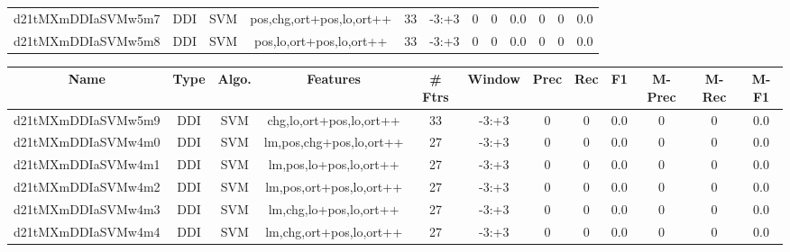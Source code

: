 \documentclass[a4paper]{article}
\begin{document}
\begin{landscape}
\begin{center}
\begin{tabular}{ |c|c|c|c|c|c|c|c|c|c|c|c|}
 
 	
 	\small{ d21tMXmDDIaSVMw5m7 } & \small{ DDI} & \small{  SVM }  & pos,chg,ort+pos,lo,ort++  &  33 &  \small{  -3:+3 }  &  0 & 0 & 0.0  &  0 & 0 & 0.0 \\
 	

 
 	
 	\small{ d21tMXmDDIaSVMw5m8 } & \small{ DDI} & \small{  SVM }  & pos,lo,ort+pos,lo,ort++  &  33 &  \small{  -3:+3 }  &  0 & 0 & 0.0  &  0 & 0 & 0.0 \\
 	
 \hline
\end{tabular}
\end{center}




\begin{center}
\begin{tabular}{ |c|c|c|c|c|c|c|c|c|c|c|c|} 
 \hline
 	Name & Type & Algo. & Features & \# Ftrs & Window & Prec & Rec & F1 & M-Prec & M-Rec & M-F1\\
 \hline

 	

 
 	
 	\small{ d21tMXmDDIaSVMw5m9 } & \small{ DDI} & \small{  SVM }  & chg,lo,ort+pos,lo,ort++  &  33 &  \small{  -3:+3 }  &  0 & 0 & 0.0  &  0 & 0 & 0.0 \\
 	

 
 	
 	\small{ d21tMXmDDIaSVMw4m0 } & \small{ DDI} & \small{  SVM }  & lm,pos,chg+pos,lo,ort++  &  27 &  \small{  -3:+3 }  &  0 & 0 & 0.0  &  0 & 0 & 0.0 \\
 	

 
 	
 	\small{ d21tMXmDDIaSVMw4m1 } & \small{ DDI} & \small{  SVM }  & lm,pos,lo+pos,lo,ort++  &  27 &  \small{  -3:+3 }  &  0 & 0 & 0.0  &  0 & 0 & 0.0 \\
 	

 
 	
 	\small{ d21tMXmDDIaSVMw4m2 } & \small{ DDI} & \small{  SVM }  & lm,pos,ort+pos,lo,ort++  &  27 &  \small{  -3:+3 }  &  0 & 0 & 0.0  &  0 & 0 & 0.0 \\
 	

 
 	
 	\small{ d21tMXmDDIaSVMw4m3 } & \small{ DDI} & \small{  SVM }  & lm,chg,lo+pos,lo,ort++  &  27 &  \small{  -3:+3 }  &  0 & 0 & 0.0  &  0 & 0 & 0.0 \\
 	

 
 	
 	\small{ d21tMXmDDIaSVMw4m4 } & \small{ DDI} & \small{  SVM }  & lm,chg,ort+pos,lo,ort++  &  27 &  \small{  -3:+3 }  &  0 & 0 & 0.0  &  0 & 0 & 0.0 \\
 	


\end{tabular}
\end{center}
\end{landscape}
\end{document}
